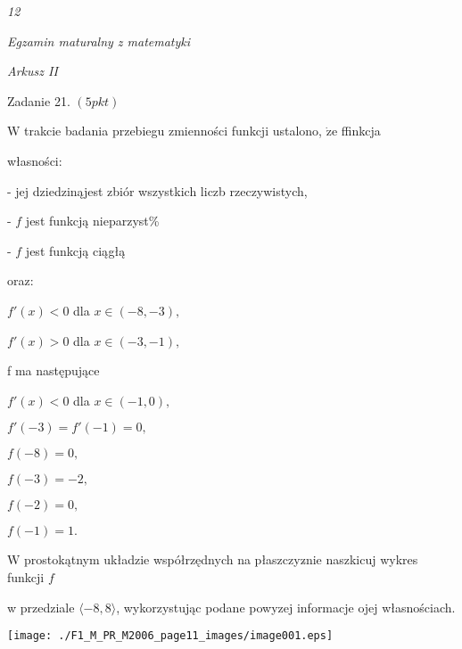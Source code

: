 \documentclass[a4paper,12pt]{article}
\begin{document}
{\it 12}

{\it Egzamin maturalny z matematyki}

{\it Arkusz II}

Zadanie 21. $(5pkt)$

$\mathrm{W}$ trakcie badania przebiegu zmienności funkcji ustalono, $\dot{\mathrm{z}}\mathrm{e}$ ffinkcja

własności:

- jej dziedzinąjest zbiór wszystkich liczb rzeczywistych,

- $f$ jest funkcją nieparzyst\%

- $f$ jest funkcją ciągłą

oraz:

$f'(x)<0$ dla $x\in(-8,-3),$

$f'(x)>0$ dla $x\in(-3,-1),$

f ma następujące

$f'(x)<0$ dla $x\in(-1,0),$

$f'(-3)=f'(-1)=0,$

$f(-8)=0,$

$f(-3)=-2,$

$f(-2)=0,$

$f(-1)=1.$

$\mathrm{W}$ prostokątnym układzie współrzędnych na płaszczyz$\acute{}$nie naszkicuj wykres funkcji $f$

w przedziale $\langle-8,8\rangle$, wykorzystując podane powyzej informacje ojej własnościach.
\begin{center}
\texttt{[image: ./F1\_M\_PR\_M2006\_page11\_images/image001.eps]}
\end{center}
\end{document}
